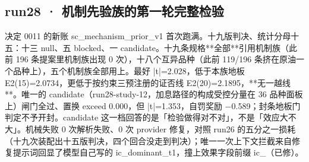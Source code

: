 \documentclass[11pt]{ctexart}
\begin{document}
\subsection{run28 · 机制先验族的第一轮完整检验}
决定 0011 的新账 sc\_mechanism\_prior\_v1 首次跑满。十九版判决、统计分母十五：十三 null、五 blocked、一 candidate。十九条规格**全部**引用机制族（此前 196 条提案里机制族出现 0 次），十八个互异品种（此前 119/196 条挤在原油一个品种上），五个机制族全部用上。最好 |t|=2.028，低于本族地板 E2(15)=2.0734，更低于按约束三预注册的证否线 E2(20)=2.1895，**无一越线**。唯一的 candidate（run28-study-12，加息路径的构成受控分量在 36 品种面板上）闸门全过、置换 exceed 0.000，但 |t|=1.353，自罚奖励 −0.589；封条地板门判定不予开封。candidate 这一档回答的是「检验做得对不对」，不是「效应大不大」。机械失败 0 次解析失败、0 次 provider 修复，对照 run26 的五分之一损耗（十九次装配出十五版判决，四个回合没走到判决）；唯一一次上下文拦截来自修复提示词回显了模型自己写的 ic\_dominant\_t1，撞上效果字段前缀 ic\_（已修）。
\end{document}
